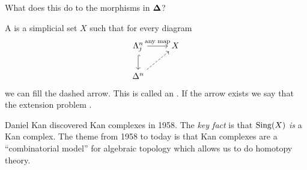 \begin{exercise}
	What does this do to the morphisms in $\mathbf{\Delta}$?
\end{exercise}
\begin{definition}
	A  is a simplicial set $X$ such that for every diagram
	\[
	\begin{tikzcd}
		\Lambda^{n}_j \ar[r,"\text{any map}"] \ar[d,hook] & X \\
		\Delta^{n} \ar[ur,dashed]
	\end{tikzcd}
	\] 
	we can fill the dashed arrow. This is called an . If the arrow exists we say that the extension problem .
\end{definition}
Daniel Kan discovered Kan complexes in 1958. The \emph{key fact} is that $\operatorname{Sing}(X)$ \emph{is} a Kan complex. The theme from 1958 to today is that Kan complexes are a ``combinatorial model'' for algebraic topology which allows us to do homotopy theory.

